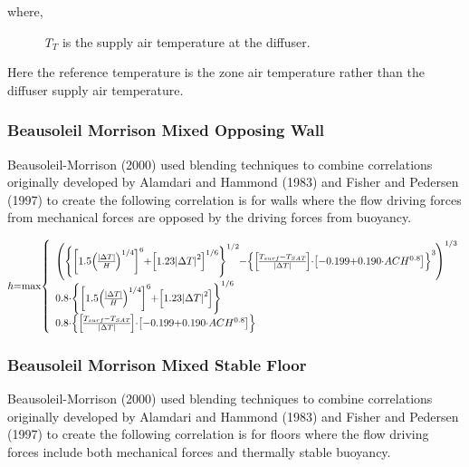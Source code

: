 where,

~~~~~ \emph{T\(_{T}\)} is the supply air temperature at the diffuser.

Here the reference temperature is the zone air temperature rather than the diffuser supply air temperature.

\subsubsection{Beausoleil Morrison Mixed Opposing Wall}\label{beausoleil-morrison-mixed-opposing-wall}

Beausoleil-Morrison (2000) used blending techniques to combine correlations originally developed by Alamdari and Hammond (1983) and Fisher and Pedersen (1997) to create the following correlation is for walls where the flow driving forces from mechanical forces are opposed by the driving forces from buoyancy.

\begin{equation}
\medmuskip=0mu
\thinmuskip=0mu
\thickmuskip=0mu
\nulldelimiterspace=0pt
\scriptspace=0pt
h = \max \left\{
\begin{array}{l}
\left(\left\{\left[1.5\left(\frac{\left|\Delta T\right|}{H}\right)^{1/4}\right]^6+\left[1.23\left|\Delta T\right|^2\right]^{1/6}\right\}^{1/2}-\left\{\left[\frac{T_{surf}-T_{SAT}}{\left|\Delta T\right|}\right]\cdot\left[-0.199+0.190\cdot ACH^{0.8}\right]\right\}^3\right)^{1/3} \\
0.8\cdot \left\{\left[1.5\left(\frac{\left|\Delta T\right|}{H}\right)^{1/4}\right]^6+\left[1.23\left|\Delta T\right|^2\right]\right\}^{1/6} \\
0.8\cdot \left\{\left[\frac{T_{surf}-T_{SAT}}{\left|\Delta T\right|}\right]\cdot\left[-0.199+0.190\cdot ACH^{0.8}\right]\right\}
\end{array}
\right.
\end{equation}

\subsubsection{Beausoleil Morrison Mixed Stable Floor}\label{beausoleil-morrison-mixed-stable-floor}

Beausoleil-Morrison (2000) used blending techniques to combine correlations originally developed by Alamdari and Hammond (1983) and Fisher and Pedersen (1997) to create the following correlation is for floors where the flow driving forces include both mechanical forces and thermally stable buoyancy.

